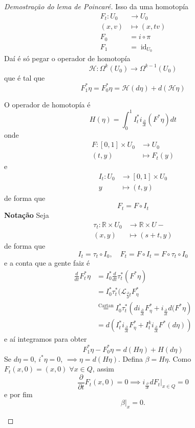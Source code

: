 \begin{itemize}
\begin{proof}[Demostra\c c\~ao do lema de Poincar\'e]
			Isso da uma homotop\'ia
			\begin{align*}
				F_t: U_0 &\longrightarrow U_0 \\
				(x,v) &\longmapsto (x,tv)\\
				F_0&=i\circ \pi\\
				F_1&=\operatorname{id}_{U_0}
			\end{align*}
			Da\'i \'e s\'o pegar o operador de homotop\'ia
			\[\mathcal{H}:\Omega^{k}(U_0)\to \Omega^{k-1}(U_0)\]
			que \'e tal que
			\[F_1^*\eta=F_0^* \eta=\mathcal{H}(d\eta)+d(\mathcal{H}\eta)\]
			\begin{claim}
				O operador de homotop\'ia \'e
				\[H(\eta)=\int_{0}^1I^*_ti_{ \frac{\partial }{\partial t}}(F^*\eta)dt\]
				onde
				\begin{align*}
					F: [0,1]\times U_0 &\longrightarrow U_0 \\
					(t,y) &\longmapsto F_t(y)
				\end{align*}
				e
				\begin{align*}
					I_t: U_0 &\longrightarrow [0,1]\times U_0 \\
					y &\longmapsto (t,y)
				\end{align*}
				de forma que
				\[F_t=F\circ I_t\]
				\textbf{Nota\c c\~ao} Seja
				\begin{align*}
					\tau_t: \mathbb{R}\times U_0 &\longrightarrow \mathbb{R}\times U- \\
					(x,y) &\longmapsto (s+t,y)
				\end{align*}
				de forma que
				\[I_t=\tau_t\circ I_0,\quad F_t=F\circ I_t=F\circ \tau_t\circ I_0\]
				e a conta que a gente faiz \'e
				\begin{align*}
					\frac{d}{dt}F_t^*\eta&=I_0^*\frac{d}{dt}\tau_t^* (F^* \eta)\\
					&=I_0^* \tau_t^* (\mathcal{L}_{\frac{\partial }{\partial }t}F^*_{\eta}\\
					&\overset{\text{Cartan}}{=}I_0^* \tau_t^*\left( di_{ \frac{\partial }{\partial t}}F^* _\eta+i_{\frac{\partial }{\partial t}}d(F^*\eta \right) \\
					&=d\left( I_{t}^* i_{\frac{\partial }{\partial t}}F^*_{\eta}+I_t^ki_{\frac{\partial }{\partial t}}F^*(d\eta) \right) 
				\end{align*}
				e a\'i integramos para obter
				\[F_1^*\eta-F^*_0\eta=d(H\eta)+H(d\eta)\]
				Se $d\eta=0$,  $i^*\eta=0$, $\implies \eta=d(H\eta)$. Defina $\beta=H\eta$. Como  $F_t(x,0)=(x,0)\;\forall x\in Q$, assim
				\[\frac{\partial }{\partial t}F_t(x,0)=0\implies i_{\frac{\partial }{\partial t}}dF_t |_{x\in Q}=0\]
				e por fim
				\[\beta|_{x}=0.\]
			\end{claim}
		\end{proof}
\end{itemize}


